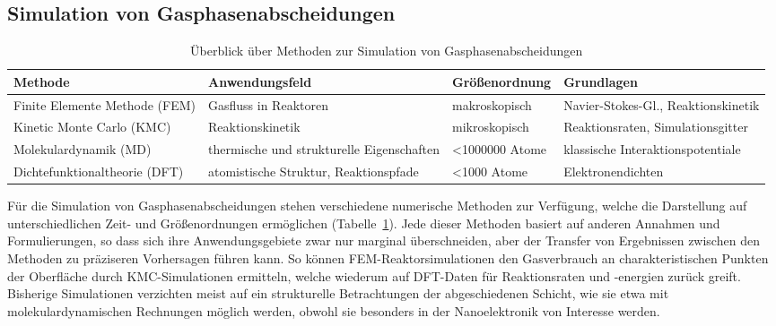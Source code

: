 \subsection{Simulation von Gasphasenabscheidungen}

\begin{table}
  \oddrowcolors
  \caption{Überblick über Methoden zur Simulation von Gasphasenabscheidungen}
  \label{tab:deposition-simulations}
  \begin{tabularx}{\textwidth}{|XXlX|}
    \hline
    \textbf{Methode}                  & \textbf{Anwendungsfeld}                   & \textbf{Größenordnung} & \textbf{Grundlagen}                 \\
    \hline
    Finite Elemente Methode (FEM)     & Gasfluss in Reaktoren                     & makroskopisch          & Navier-Stokes-Gl., Reaktionskinetik \\
    Kinetic Monte Carlo (KMC)         & Reaktionskinetik                          & mikroskopisch          & Reaktionsraten, Simulationsgitter   \\
    Molekular\-dynamik (MD)           & thermische und strukturelle Eigenschaften & \num{<1000000} Atome   & klassische Interaktionspotentiale   \\
    Dichte\-funktional\-theorie (DFT) & atomistische Struktur, Reaktionspfade     & \num{<1000} Atome      & Elektronendichten                   \\
    \hline
  \end{tabularx}
\end{table}


Für die Simulation von Gasphasenabscheidungen stehen verschiedene numerische Methoden zur Verfügung, welche die Darstellung auf unterschiedlichen Zeit- und Größenordnungen ermöglichen (Tabelle~\ref{tab:deposition-simulations}).
Jede dieser Methoden basiert auf anderen Annahmen und Formulierungen, so dass sich ihre Anwendungsgebiete zwar nur marginal überschneiden, aber der Transfer von Ergebnissen zwischen den Methoden zu präziseren Vorhersagen führen kann.
So können FEM-Reaktorsimulationen den Gasverbrauch an charakteristischen Punkten der Oberfläche durch KMC-Simulationen ermitteln, welche wiederum auf DFT-Daten für Reaktionsraten und -energien zurück greift.
Bisherige Simulationen verzichten meist auf ein strukturelle Betrachtungen der abgeschiedenen Schicht, wie sie etwa mit molekulardynamischen Rechnungen möglich werden, obwohl sie besonders in der Nanoelektronik von Interesse werden.
